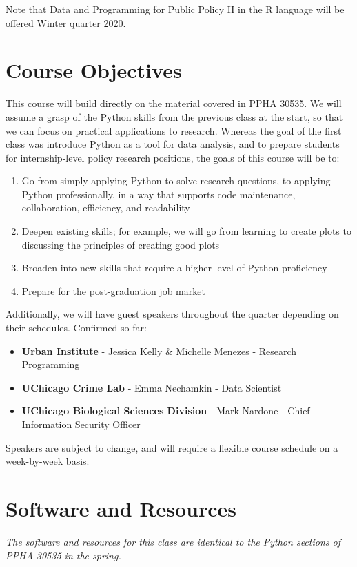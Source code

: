 \documentclass{article}
\begin{document}
Note that Data and Programming for Public Policy II in the R language will be offered Winter quarter 2020.

\section*{Course Objectives}
This course will build directly on the material covered in PPHA 30535.  We will assume a grasp of the Python skills from the previous class at the start, so that we can focus on practical applications to research.  Whereas the goal of the first class was introduce Python as a tool for data analysis, and to prepare students for internship-level policy research positions, the goals of this course will be to:

\begin{enumerate}
	\item Go from simply applying Python to solve research questions, to applying Python professionally, in a way that supports code maintenance, collaboration, efficiency, and readability
	\item Deepen existing skills; for example, we will go from learning to create plots to discussing the principles of creating good plots
	\item Broaden into new skills that require a higher level of Python proficiency 
	\item Prepare for the post-graduation job market
\end{enumerate}

\noindent Additionally, we will have guest speakers throughout the quarter depending on their schedules.  Confirmed so far:

\begin{itemize}
	\item \textbf{Urban Institute} - Jessica Kelly \& Michelle Menezes - Research Programming
	\item \textbf{UChicago Crime Lab} - Emma Nechamkin - Data Scientist
	\item \textbf{UChicago Biological Sciences Division} - Mark Nardone - Chief Information Security Officer 
\end{itemize}

\noindent Speakers are subject to change, and will require a flexible course schedule on a week-by-week basis.


\section*{Software and Resources}
\emph{The software and resources for this class are identical to the Python sections of PPHA 30535 in the spring.}
\end{document}
